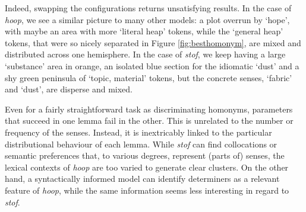 \documentclass[
]{book}
\begin{document}
Indeed, swapping the configurations returns unsatisfying results. In the case of \emph{hoop}, we see a similar picture to many other models: a plot overrun by `hope', with maybe an area with more `literal heap' tokens, while the `general heap' tokens, that were so nicely separated in Figure \ref{fig:besthomonym}, are mixed and distributed across one hemisphere. In the case of \emph{stof}, we keep having a large `substance' area in orange, an isolated blue section for the idiomatic `dust' and a shy green peninsula of `topic, material' tokens, but the concrete senses, `fabric' and `dust', are disperse and mixed.

Even for a fairly straightforward task as discriminating homonyms, parameters that succeed in one lemma fail in the other. This is unrelated to the number or frequency of the senses. Instead, it is inextricably linked to the particular distributional behaviour of each lemma. While \emph{stof} can find collocations or semantic preferences that, to various degrees, represent (parts of) senses, the lexical contexts of \emph{hoop} are too varied to generate clear clusters. On the other hand, a syntactically informed model can identify determiners as a relevant feature of \emph{hoop}, while the same information seems less interesting in regard to \emph{stof}.
\end{document}
